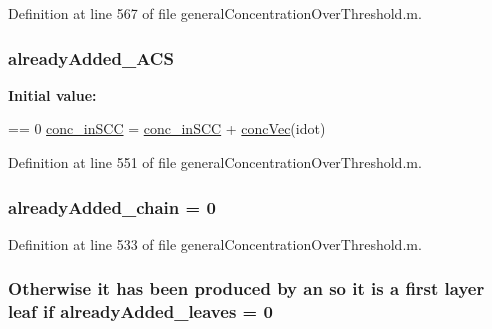 Definition at line 567 of file general\-Concentration\-Over\-Threshold.\-m.

\hypertarget{a00022_a77c2cda04a3103708011753a77dceda3}{
\subsubsection[{already\-Added\-\_\-\-A\-C\-S}]{\setlength{\rightskip}{0pt plus 5cm}already\-Added\-\_\-\-A\-C\-S}}\label{a00022_a77c2cda04a3103708011753a77dceda3}
{\bfseries Initial value\-:}
\begin{DoxyCode}
== 0 %
                                                \hyperlink{a00022_a2ac2f79c8327273bba427ba3e8d2cfbe}{conc\_inSCC} = 
      \hyperlink{a00022_a2ac2f79c8327273bba427ba3e8d2cfbe}{conc\_inSCC} + \hyperlink{a00022_a5cb5865443d8f156213280c070385e0d}{concVec}(idot)
\end{DoxyCode}


Definition at line 551 of file general\-Concentration\-Over\-Threshold.\-m.

\hypertarget{a00022_a1ddec545d7ccb86836f79e7f7e9ecb55}{
\subsubsection[{already\-Added\-\_\-chain}]{ already\-Added\-\_\-chain = 0}}\label{a00022_a1ddec545d7ccb86836f79e7f7e9ecb55}


Definition at line 533 of file general\-Concentration\-Over\-Threshold.\-m.

\hypertarget{a00022_aabbdc56dad7f3314f69a712de710352c}{
\subsubsection[{already\-Added\-\_\-leaves}]{ Otherwise it has been produced by an so it is {\bf a} first layer leaf {\bf if} already\-Added\-\_\-leaves = 0}}\label{a00022_aabbdc56dad7f3314f69a712de710352c}


